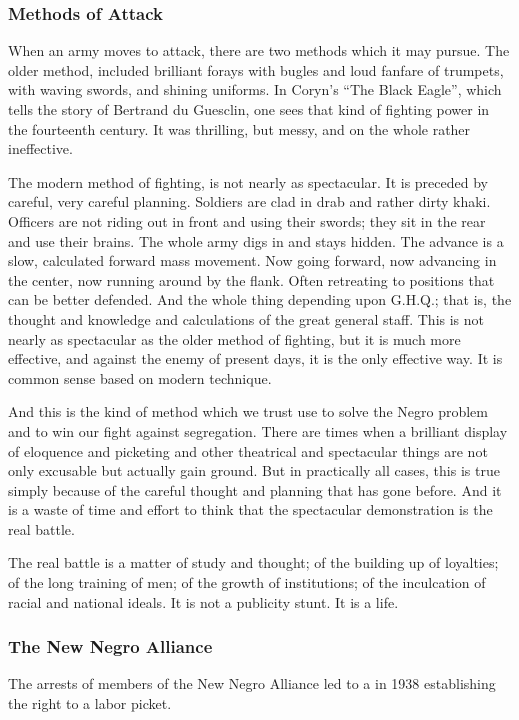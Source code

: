 \documentclass[letterpaper,10pt,english]{jupyterBook}
\begin{document}
\subsubsection{Methods of Attack}
\label{\detokenize{Volumes/41/06/counsels_of_despair:methods-of-attack}}
\sphinxAtStartPar
When an army moves to attack, there are two methods which it may pursue. The older method, included brilliant forays with bugles and loud fanfare of trumpets, with waving swords, and shining uniforms. In Coryn’s “The Black Eagle”, which tells the story of Bertrand du Guesclin, one sees that kind of fighting power in the fourteenth century. It was thrilling, but messy, and on the whole rather ineffective.

\sphinxAtStartPar
The modern method of fighting, is not nearly as spectacular. It is preceded by careful, very careful planning. Soldiers are clad in drab and rather dirty khaki. Officers are not riding out in front and using their swords; they sit in the rear and use their brains. The whole army digs in and stays hidden. The advance is a slow, calculated forward mass movement. Now going forward, now advancing in the center, now running around by the flank. Often retreating to positions that can be better defended. And the whole thing depending upon G.H.Q.; that is, the thought and knowledge and calculations of the great general staff. This is not nearly as spectacular as the older method of fighting, but it is much more effective, and against the enemy of present days, it is the only effective way. It is common sense based on modern technique.

\sphinxAtStartPar
And this is the kind of method which we trust use to solve the Negro problem and to win our fight against segregation. There are times when a brilliant display of eloquence and picketing and other theatrical and spectacular things are not only excusable but actually gain ground. But in practically all cases, this is true simply because of the careful thought and planning that has gone before. And it is a waste of time and effort to think that the spectacular demonstration is the real battle.

\sphinxAtStartPar
The real battle is a matter of study and thought; of the building up of loyalties; of the long training of men; of the growth of institutions; of the inculcation of racial and national ideals. It is not a publicity stunt. It is a life.


\subsubsection{The New Negro Alliance}
\label{\detokenize{Volumes/41/06/counsels_of_despair:the-new-negro-alliance}}
\begin{sphinxShadowBox}
\sphinxstylesidebartitle{}

\sphinxAtStartPar
The arrests of members of the New Negro Alliance led to a  in 1938 establishing the right to a labor picket.
\end{sphinxShadowBox}
\end{document}
